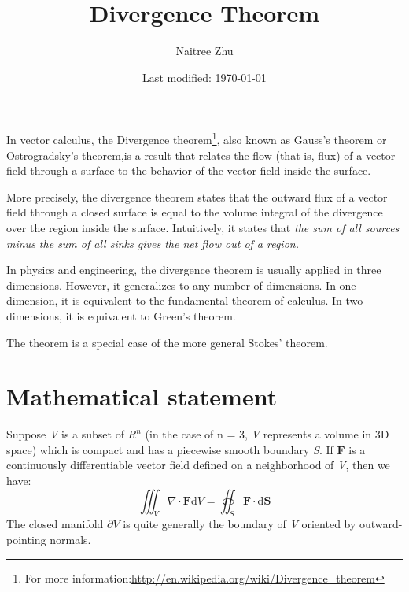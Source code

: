 \documentclass[a4paper]{article}
\title{Divergence Theorem}
\author{Naitree Zhu}
\date{Last modified: \today}
\begin{document}
\maketitle
In vector calculus, the Divergence theorem\footnote{For more information:\url{http://en.wikipedia.org/wiki/Divergence_theorem}}, also known as Gauss's theorem or Ostrogradsky's theorem,is a result that relates the flow (that is, flux) of a vector field through a surface to the behavior of the vector field inside the surface.

More precisely, the divergence theorem states that the outward flux of a vector field through a closed surface is equal to the volume integral of the divergence over the region inside the surface. Intuitively, it states that \emph{the sum of all sources minus the sum of all sinks gives the net flow out of a region.}

In physics and engineering, the divergence theorem is usually applied in three dimensions. However, it generalizes to any number of dimensions. In one dimension, it is equivalent to the fundamental theorem of calculus. In two dimensions, it is equivalent to Green's theorem.

The theorem is a special case of the more general Stokes' theorem.

\part{Mathematical statement}
Suppose \textit{V} is a subset of $R^{n}$ (in the case of n = 3, \textit{V} represents a volume in 3D space) which is compact and has a piecewise smooth boundary \textit{S}. If $\boldsymbol{F}$ is a continuously differentiable vector field defined on a neighborhood of \textit{V}, then we have:
\begin{equation}
\iiint_V \nabla\cdot\boldsymbol{F}\mathrm{d}V = \oiint_S \boldsymbol{F}\cdot\mathrm{d}\boldsymbol{S}
\end{equation}
The closed manifold $\partial V$ is quite generally the boundary of \textit{V} oriented by outward-pointing normals.
\end{document}
